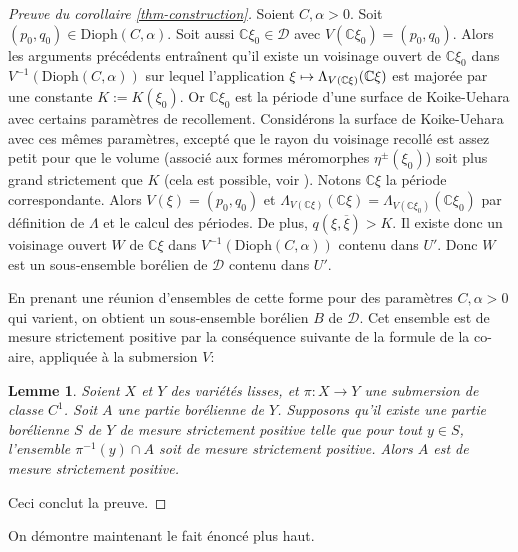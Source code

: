 \documentclass[JEP,XML,SOM,Unicode,francais,published]{cedram}
\newcommand\mto{\mathchoice{\longmapsto}{\mapsto}{\mapsto}{\mapsto}}
\newcommand{\C}{\mathbb{C}}
\newtheorem{lem}[thm]{Lemme}
\theoremstyle{definition}
\begin{document}
\begin{proof}[Preuve du corollaire \ref{thm-construction}]
Soient $C, \alpha > 0$. Soit $(p_0, q_0) \in \mathrm{Dioph}(C, \alpha)$. Soit aussi $\C\xi_0 \in \mathscr{D}$ avec $V(\C\xi_0) = (p_0, q_0)$. Alors les arguments précédents entraînent qu'il existe un voisinage ouvert de $\C\xi_0$ dans $V^{-1}(\text{Dioph}(C, \alpha))$ sur lequel l'application $\xi \mto \Lambda_{V(\C\xi)}(\C\xi)$ est majorée par une constante $K:= K(\xi_0)$. Or $\C\xi_0$ est la période d'une surface de Koike-Uehara avec certains paramètres de recollement. Considérons la surface de Koike-Uehara avec ces mêmes paramètres, excepté que le rayon du voisinage recollé est assez petit pour que le volume (associé aux formes méromorphes $\eta^{\pm}(\xi_0)$) soit plus grand strictement que $K$ (cela est possible, voir \cite[dém.\,de\,la\,prop.\,2.5]{koike2019gluing}). Notons $\C\xi$ la période correspondante. Alors $V(\xi) = (p_0, q_0)$ et $\Lambda_{V(\C\xi)}(\C\xi) = \Lambda_{V(\C\xi_0)}(\C\xi_0)$ par définition de $\Lambda$ \cite[th.\,6.2 et sa dém.]{koike2019gluing} et le calcul des périodes. De plus, $q(\xi, \overline{\xi}) > K$.
Il existe donc un voisinage ouvert $W$ de $\C\xi$ dans $V^{-1}(\mathrm{Dioph}(C, \alpha))$ contenu dans $U'$. Donc $W$ est un sous-ensemble borélien de $\mathscr{D}$ contenu dans $U'$.

En prenant une réunion d'ensembles de cette forme pour des paramètres $C, \alpha > 0$ qui varient, on obtient un sous-ensemble borélien $B$ de $\mathscr{D}$. Cet ensemble est de mesure strictement positive par la conséquence suivante de la formule de la co-aire, appliquée à la submersion $V$:

\begin{lem}
\label{fubini}
Soient $X$ et $Y$ des variétés lisses, et $\pi \colon X \to Y$ une submersion de classe $C^1$. Soit $A$ une partie borélienne de $Y$. Supposons qu'il existe une partie borélienne $S$ de $Y$ de mesure strictement positive telle que pour tout $y \in S$, l'ensemble $\pi^{-1}(y) \cap A$ soit de mesure strictement positive. Alors $A$ est de mesure strictement positive.
\end{lem}

Ceci conclut la preuve.
\end{proof}

On démontre maintenant le fait énoncé plus haut.
\end{document}
